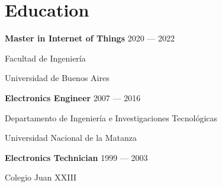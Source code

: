 \section{Education}

\parbox[t][][t]{\linewidth}{
	\parbox{\linewidth}{\textbf{Master in Internet of Things} \hfill {{2020 --- 2022}}}
	\parbox{\linewidth}{{Facultad de Ingeniería}}
	\parbox{\linewidth}{{Universidad de Buenos Aires}}
}

\parbox[t][][t]{\linewidth}{
	\parbox{\linewidth}{\textbf{Electronics Engineer} \hfill {{2007 --- 2016}}}
	\parbox{\linewidth}{{Departamento de Ingeniería e Investigaciones Tecnológicas}}
	\parbox{\linewidth}{{Universidad Nacional de la Matanza}}
}

\parbox[t][][t]{\linewidth}{
	\parbox{\linewidth}{\textbf{Electronics Technician} \hfill {{1999 --- 2003}}}
	\parbox{\linewidth}{{Colegio Juan XXIII}}
}

